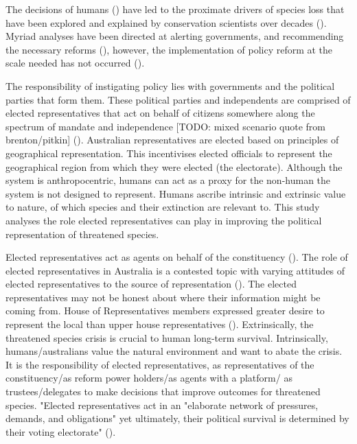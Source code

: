\documentclass[a4paper,11pt]{article}
\begin{document}
The decisions of humans (\cite{rydenLinkingDemocracyBiodiversity2020, dalbyAnthropoceneFormationsEnvironmental2017a,burkeSpeciesBordersPolitical2020}) have led to the proximate drivers of species loss that have been explored and explained by conservation scientists over decades (\cite{kearneyThreatsAustraliaImperilled2019,allekThreatsEndangeringAustralia2018}). Myriad analyses have been directed at alerting governments, and recommending the necessary reforms (\cite{hawkeReportIndependentReview2009,samuelIndependentReviewEPBC2020,mcdonaldImprovingPolicyEfficiency2015}), however, the implementation of policy reform at the scale needed has not occurred (\cite{woinarskiContributionPolicyLaw2017,resideHowSendFinch2019}).

The responsibility of instigating policy lies with governments and the political parties that form them. These political parties and independents are comprised of elected representatives that act on behalf of citizens somewhere along the spectrum of mandate and independence [TODO: mixed scenario quote from brenton/pitkin] (\cite{pitkinConceptRepresentation1972,rohrschneiderIntroductionPoliticalRepresentation2020}). Australian representatives are elected based on principles of geographical representation. This incentivises elected officials to represent the geographical region from which they were elected (the electorate). Although the system is anthropocentric, humans can act as a proxy for the non-human the system is not designed to represent. Humans ascribe intrinsic and extrinsic value to nature, of which species and their extinction are relevant to. This study analyses the role elected representatives can play in improving the political representation of threatened species.

Elected representatives act as agents on behalf of the constituency (\cite{pitkinConceptRepresentation1972}).
The role of elected representatives in Australia is a contested topic with varying attitudes of elected representatives to the source of representation (\cite{brentonRepresentativeRolesResponsibilities}). The elected representatives may not be honest about where their information might be coming from. House of Representatives members expressed greater desire to represent the local than upper house representatives (\cite{brentonRepresentativeRolesResponsibilities}).
Extrinsically, the threatened species crisis is crucial to human long-term survival. Intrinsically, humans/australians value the natural environment and want to abate the crisis. It is the responsibility of elected representatives, as representatives of the constituency/as reform power holders/as agents with a platform/ as trustees/delegates to make decisions that improve outcomes for threatened species.
"Elected representatives act in an "elaborate network of pressures, demands, and obligations" yet ultimately, their political survival is determined by their voting electorate" (\cite{pitkinConceptRepresentation1972,brentonRepresentativeRolesResponsibilities}).
\end{document}
